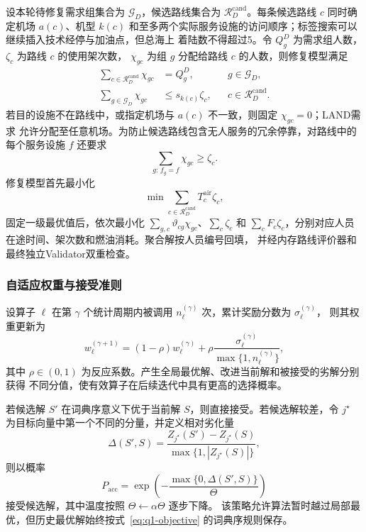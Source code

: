 \documentclass[UTF8,a4paper,zihao=5]{ctexart}
\begin{document}
设本轮待修复需求组集合为 $\mathcal G_D$，候选路线集合为
$\mathcal R_D^{\mathrm{cand}}$。每条候选路线 $c$ 同时确定机场 $a(c)$、机型 $k(c)$
和至多两个实际服务设施的访问顺序；标签搜索可以继续插入技术经停与加油点，但总海上
着陆数不得超过5。令 $Q_g^D$ 为需求组人数，$\zeta_c$ 为路线 $c$ 的使用架次数，
$\chi_{gc}$ 为组 $g$ 分配给路线 $c$ 的人数，则修复模型满足
\begin{align}
  \sum_{c\in\mathcal R_D^{\mathrm{cand}}}\chi_{gc}&=Q_g^D,
  &&g\in\mathcal G_D,\label{eq:q1-repair-cover}\\
  \sum_{g\in\mathcal G_D}\chi_{gc}&\le s_{k(c)}\zeta_c,
  &&c\in\mathcal R_D^{\mathrm{cand}}.\label{eq:q1-repair-capacity}
\end{align}
若目的设施不在路线中，或指定机场与 $a(c)$ 不一致，则固定 $\chi_{gc}=0$；LAND需求
允许分配至任意机场。为防止候选路线包含无人服务的冗余停靠，对路线中的每个服务设施
$f$ 还要求
\begin{equation}
  \sum_{g:\,f_g=f}\chi_{gc}\ge\zeta_c.
  \label{eq:q1-repair-service}
\end{equation}
修复模型首先最小化
\begin{equation}
  \min\sum_{c\in\mathcal R_D^{\mathrm{cand}}}T_c^{\mathrm{air}}\zeta_c,
  \label{eq:q1-repair-objective}
\end{equation}
固定一级最优值后，依次最小化
$\sum_{g,c}\vartheta_{cg}\chi_{gc}$、$\sum_c\zeta_c$ 和
$\sum_c F_c\zeta_c$，分别对应人员在途时间、架次数和燃油消耗。聚合解按人员编号回填，
并经内存路线评价器和最终独立Validator双重检查。

\subsubsection{自适应权重与接受准则}

设算子 $\ell$ 在第 $\gamma$ 个统计周期内被调用
$n_{\ell}^{(\gamma)}$ 次，累计奖励分数为 $\sigma_{\ell}^{(\gamma)}$，
则其权重更新为
\begin{equation}
  w_{\ell}^{(\gamma+1)}
  =(1-\rho)w_{\ell}^{(\gamma)}
  +\rho\frac{\sigma_{\ell}^{(\gamma)}}{\max\{1,n_{\ell}^{(\gamma)}\}},
  \label{eq:q1-alns-weight}
\end{equation}
其中 $\rho\in(0,1)$ 为反应系数。产生全局最优解、改进当前解和被接受的劣解分别获得
不同分值，使有效算子在后续迭代中具有更高的选择概率。

若候选解 $S'$ 在词典序意义下优于当前解 $S$，则直接接受。若候选解较差，令
$j^\star$ 为目标向量中第一个不同的分量，并定义相对劣化量
\begin{equation}
  \Delta(S',S)=
  \frac{Z_{j^\star}(S')-Z_{j^\star}(S)}
  {\max\{1,|Z_{j^\star}(S)|\}},
  \label{eq:q1-deterioration}
\end{equation}
则以概率
\begin{equation}
  P_{\mathrm{acc}}
  =\exp\left(-\frac{\max\{0,\Delta(S',S)\}}{\Theta}\right)
  \label{eq:q1-acceptance}
\end{equation}
接受候选解，其中温度按照 $\Theta\leftarrow\alpha\Theta$ 逐步下降。
该策略允许算法暂时越过局部最优，但历史最优解始终按式~\eqref{eq:q1-objective}
的词典序规则保存。
\end{document}
